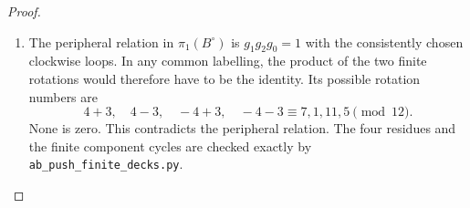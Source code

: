 \begin{proof}
\begin{enumerate}[label=\arabic*.,leftmargin=*]
\item The peripheral relation in
$\pi_1(B^\circ)$ is $g_1g_2g_0=1$ with
the consistently chosen clockwise loops.
In any common labelling, the product of the
two finite rotations would therefore have
to be the identity. Its possible rotation
numbers are
\[
 4+3,\quad4-3,\quad-4+3,\quad-4-3
 \equiv7,1,11,5\pmod {12}.
\]
None is zero. This contradicts the peripheral
relation. The four residues and the finite
component cycles are checked exactly by
\texttt{ab\_push\_finite\_decks.py}.
\end{enumerate}
\end{proof}
